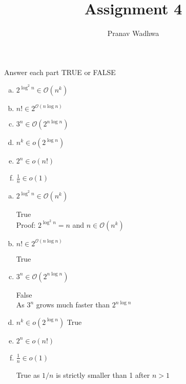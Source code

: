 \documentclass[12pt]{exam}
\title{
  Assignment 4
}
\author{Pranav Wadhwa}
\begin{document}
\maketitle
\noindent


\begin{questions}

  \question{} %
  Answer each part TRUE or FALSE

  \begin{multicols}{2}
  \begin{enumerate}[a.]

    \item $2^{\log^{2}n}\in \mathcal{O}(n^{k})$
    \item $n!\in 2^{\mathcal{O}(n\log n)}$
    \item $3^{n}\in \mathcal{O}(2^{n\log n})$
    \item $n^{k}\in o(2^{\log n})$
    \item $2^{n}\in o(n!)$
    \item $\frac{1}{n} \in o(1)$

  \end{enumerate}
\end{multicols}


\begin{solution}

  \begin{enumerate}[a.]
    \item $2^{\log^{2}n}\in \mathcal{O}(n^{k})$

          True\\
          Proof: $2^{\log^{2}n} = n$ and $n\in \mathcal{O}(n^{k})$
    \item $n!\in 2^{\mathcal{O}(n\log n)}$

          True

    \item $3^{n}\in \mathcal{O}(2^{n\log n})$

          False\\
          As $3^{n}$ grows much faster than $2^{n\log n}$
    \item $n^{k}\in o(2^{\log n})$
          True\\

    \item $2^{n}\in o(n!)$

    \item $\frac{1}{n} \in o(1)$

          True as $1/n$ is strictly smaller than 1 after $n>1$

  \end{enumerate}




\end{solution}
\end{questions}
\end{document}
